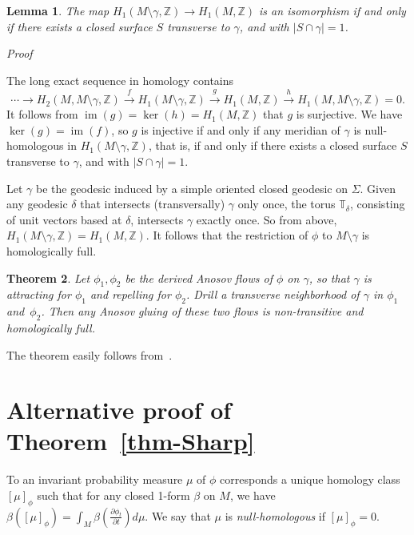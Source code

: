 \documentclass[colorinlistoftodos,12pt]{article}
\makeatletter
\newcommand{\ZZ}{\mathbb{Z}}
\newcommand{\TT}{\mathbb{T}}
\DeclareMathOperator{\im}{im}
\theoremstyle{colorplain}
\newtheorem{theorem}{Theorem}
\numberwithin{theorem}{section}
\newtheorem{lemma}[theorem]{Lemma}
\theoremstyle{colorremarkbis}
\theoremstyle{colorremark}
\theoremstyle{colordefinition}
\renewenvironment{proof}[1][Proof]{
    \setcounter{claim}{0}    
    \setcounter{claimproof}{0}    
    \par
    \pushQED{\qed}%
    \normalfont\topsep6\p@\@plus6\p@\relax
    \trivlist
    \item\relax
    {\itshape\color{RoyalPurple}#1\@addpunct{.}}\hspace\labelsep\ignorespaces
}{%
    \popQED\endtrivlist\@endpefalse
}
\newcounter{claimproof} %
\makeatother
\begin{document}
\begin{lemma}
	The map $H_1(M\setminus\gamma,\ZZ)\to H_1(M,\ZZ)$ is an isomorphism if and only if there exists a closed surface $S$ transverse to $\gamma$, and with $|S\cap\gamma|=1$.
\end{lemma}

\begin{proof}
	The long exact sequence in homology contains
	$$\cdots\to H_2(M,M\setminus\gamma,\ZZ)\xrightarrow{f} H_1(M\setminus\gamma,\ZZ)\xrightarrow{g} H_1(M,\ZZ)\xrightarrow{h} H_1(M,M\setminus\gamma,\ZZ)=0.$$
	It follows from $\im(g)=\ker(h)=H_1(M,\ZZ)$ that $g$ is surjective. We have $\ker(g)=\im(f)$, so $g$ is injective if and only if any meridian of $\gamma$ is null-homologous in $H_1(M\setminus\gamma,\ZZ)$, that is, if and only if there exists a closed surface $S$ transverse to $\gamma$, and with $|S\cap\gamma|=1$.
\end{proof}

Let $\gamma$ be the geodesic induced by a simple oriented closed geodesic on $\Sigma$. Given any geodesic $\delta$ that intersects (transversally) $\gamma$ only once, the torus $\TT_\delta$, consisting of unit vectors based at $\delta$, intersects $\gamma$ exactly once. So from above, $H_1(M\setminus\gamma,\ZZ)=H_1(M,\ZZ)$. It follows that the restriction of $\phi$ to $M\setminus\gamma$ is homologically full. 

\begin{theorem}\label{thm-example-non-t}
	Let $\phi_1,\phi_2$ be the derived Anosov flows of $\phi$ on $\gamma$, so that $\gamma$ is attracting for $\phi_1$ and repelling for $\phi_2$. Drill a transverse neighborhood of $\gamma$ in $\phi_1$ and~$\phi_2$. Then any Anosov gluing of these two flows is non-transitive and homologically full.
\end{theorem}

The theorem easily follows from~\cite{beguin2017building}.

\appendix

\section{Alternative proof of Theorem~\ref{thm-Sharp}}

To an invariant probability measure $\mu$ of $\phi$ corresponds a unique homology class $[\mu]_\phi$ such that for any closed 1-form $\beta$ on $M$, we have $\beta([\mu]_\phi)=\int_M\beta(\frac{\partial\phi_t}{\partial t})d\mu$. We say that $\mu$ is \emph{null-homologous} if $[\mu]_\phi=0$.
\end{document}
